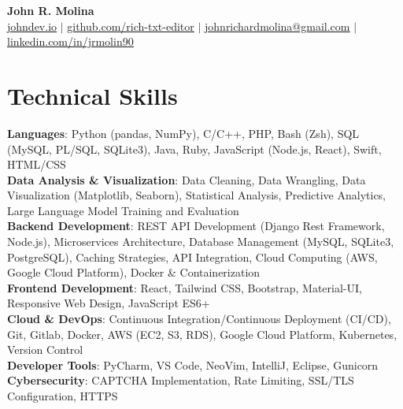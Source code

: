\documentclass[letterpaper,11pt]{article}
\begin{document}

\begin{center}
    \textbf{\Huge John R. Molina} \\ \vspace{1pt}
    \small \href{https://www.johndev.io}{\underline{johndev.io}} $|$
    \href{https://github.com/rich-txt-editor}{\underline{github.com/rich-txt-editor}} $|$
    \href{mailto:johnrichardmolina@gmail.com}{\underline{johnrichardmolina@gmail.com}} $|$
    \href{https://linkedin.com/in/jrmolin90}{\underline{linkedin.com/in/jrmolin90}}
  \end{center}

\section{Technical Skills}
 \begin{itemize}[leftmargin=0.15in, label={}]
    \small{\item{
     \textbf{Languages}{: Python (pandas, NumPy), C/C++, PHP, Bash (Zsh), SQL (MySQL, PL/SQL, SQLite3), Java, Ruby, JavaScript (Node.js, React), Swift, HTML/CSS} \\
     \textbf{Data Analysis \& Visualization}{: Data Cleaning, Data Wrangling, Data Visualization (Matplotlib, Seaborn), Statistical Analysis, Predictive Analytics, Large Language Model Training and Evaluation} \\
     \textbf{Backend Development}{: REST API Development (Django Rest Framework, Node.js), Microservices Architecture, Database Management (MySQL, SQLite3, PostgreSQL), Caching Strategies, API Integration, Cloud Computing (AWS, Google Cloud Platform), Docker \& Containerization} \\
     \textbf{Frontend Development}{: React, Tailwind CSS, Bootstrap, Material-UI, Responsive Web Design, JavaScript ES6+} \\
     \textbf{Cloud \& DevOps}{: Continuous Integration/Continuous Deployment (CI/CD), Git, Gitlab, Docker, AWS (EC2, S3, RDS), Google Cloud Platform, Kubernetes, Version Control} \\
     \textbf{Developer Tools}{: PyCharm, VS Code, NeoVim, IntelliJ, Eclipse, Gunicorn} \\
     \textbf{Cybersecurity}{: CAPTCHA Implementation, Rate Limiting, SSL/TLS Configuration, HTTPS} \\
    }}
 \end{itemize}
\end{document}
